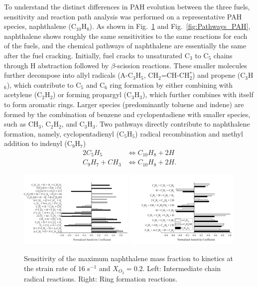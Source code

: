 \documentclass[review,3p,times]{elsarticleUS}
\begin{document}
To understand the distinct differences in PAH evolution between the three fuels, sensitivity and reaction path analysis was performed on a representative PAH species, naphthalene (C$_{10}$H$_8$). As shown in Fig.~\ref{fig:SA4} and Fig.~\ref{fig:Pathways_PAH}, naphthalene shows roughly the same sensitivities to the same reactions for each of the fuels, and the chemical pathways of naphthalene are essentially the same after the fuel cracking. Initially, fuel cracks to unsaturated C$_3$ to C$_5$ chains through H abstraction followed by $\beta$-scission reactions. These smaller molecules further decompose into allyl radicals (A-C$_3$H$_5$, CH$_2$=CH-CH$_2^*$) and propene (C$_3$H$_6$), which contribute to C$_5$ and C$_6$ ring formation by either combining with acetylene (C$_2$H$_2$) or forming propargyl (C$_3$H$_3$), which further combines with itself to form aromatic rings. Larger species (predominantly toluene and indene) are formed by the combination of benzene and cyclopentadiene with smaller species, such as 
CH$_3$, C$_2$H$_2$, and C$_3$H$_3$. Two pathways directly contribute to naphthalene formation, namely, cyclopentadienyl (C$_5$H$_5$) radical recombination and methyl addition to indenyl (C$_9$H$_7$)
\begin{align*}
  2 C_5H_5 &\Longleftrightarrow C_{10}H_8 + 2 H\\
  C_9H_7 + CH_3 &\Longleftrightarrow C_{10}H_8 + 2 H.
\end{align*}


\begin{figure}[ht]
  \centering
  \scriptsize
  \includegraphics[trim=0mm 0mm 0mm 8mm, clip=true,width=0.49\textwidth]{Chain.png}
  \includegraphics[trim=0mm 0mm 0mm 8mm, clip=true,width=0.49\textwidth]{Ring.png}
  \normalsize
  \vspace{-0.2in}
  \caption{Sensitivity of the maximum naphthalene mass fraction to kinetics at the strain rate of $16$ s$^{-1}$ and $X_{O_2}=0.2$. Left: Intermediate chain radical reactions. Right: Ring formation reactions.}
  \label{fig:SA4}
\end{figure}
\end{document}
